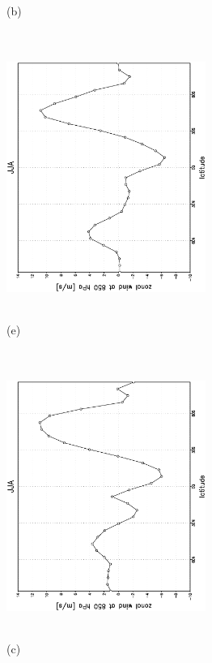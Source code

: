 \documentclass[12pt,a4paper,twoside,openright,headinclude,liststotoc,bibtotoc]{scrreprt}
\begin{document}
\begin{appendix}
\begin{figure}[c]
{}
\parbox{8.5cm}{\hspace{0.80cm} \begin{scriptsize}(b) \end{scriptsize} \vspace{-0.5cm} \\
\includegraphics[height=8.5cm,width=6.5cm,angle=-90]
{eps/zonysmu_850JJA.eps}
}
\parbox{8.5cm}{\hspace{0.80cm} \begin{scriptsize}(e) \end{scriptsize} \vspace{-0.5cm} \\
\includegraphics[height=8.5cm,width=6.5cm,angle=-90]
{eps/t21zonysmuvel131JJA850.eps}
}
\parbox{8.5cm}{\hspace{0.80cm} \begin{scriptsize}(c) \end{scriptsize} \vspace{-0.5cm} \\
}
\end{figure}
\end{appendix}
\end{document}
